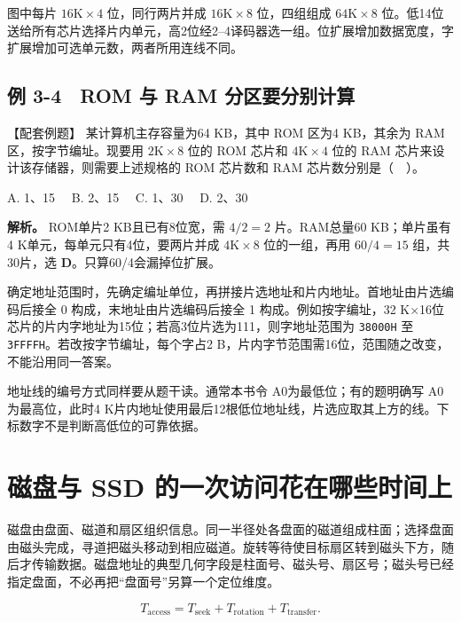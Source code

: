 图中每片 \(16\mathrm K\times4\) 位，同行两片并成 \(16\mathrm K\times8\) 位，四组组成 \(64\mathrm K\times8\) 位。低14位送给所有芯片选择片内单元，高2位经2--4译码器选一组。位扩展增加数据宽度，字扩展增加可选单元数，两者所用连线不同。

\subsection{例 3-4　ROM 与 RAM 分区要分别计算}\label{CO03-11}

\begin{example}[配套例题]

【配套例题】 某计算机主存容量为64 KB，其中 ROM 区为4 KB，其余为 RAM 区，按字节编址。现要用 \(2\mathrm K\times8\) 位的 ROM 芯片和 \(4\mathrm K\times4\) 位的 RAM 芯片来设计该存储器，则需要上述规格的 ROM 芯片数和 RAM 芯片数分别是（　）。

A. 1、15　 B. 2、15　 C. 1、30　 D. 2、30

\end{example}

\textbf{解析。} ROM单片2 KB且已有8位宽，需 \(4/2=2\) 片。RAM总量60 KB；单片虽有4 K单元，每单元只有4位，要两片并成 \(4\mathrm K\times8\) 位的一组，再用 \(60/4=15\) 组，共30片，选 \textbf{D}。只算60/4会漏掉位扩展。

确定地址范围时，先确定编址单位，再拼接片选地址和片内地址。首地址由片选编码后接全 0 构成，末地址由片选编码后接全 1 构成。例如按字编址，32 K\ensuremath{\times}16位芯片的片内字地址为15位；若高3位片选为111，则字地址范围为 \texttt{38000H} 至 \texttt{3FFFFH}。若改按字节编址，每个字占2 B，片内字节范围需16位，范围随之改变，不能沿用同一答案。

地址线的编号方式同样要从题干读。通常本书令 A0为最低位；有的题明确写 A0为最高位，此时4 K片内地址使用最后12根低位地址线，片选应取其上方的线。下标数字不是判断高低位的可靠依据。

\section{磁盘与 SSD 的一次访问花在哪些时间上}\label{CO03-12}

磁盘由盘面、磁道和扇区组织信息。同一半径处各盘面的磁道组成柱面；选择盘面由磁头完成，寻道把磁头移动到相应磁道。旋转等待使目标扇区转到磁头下方，随后才传输数据。磁盘地址的典型几何字段是柱面号、磁头号、扇区号；磁头号已经指定盘面，不必再把``盘面号''另算一个定位维度。

\[
T_{\mathrm{access}}=T_{\mathrm{seek}}+T_{\mathrm{rotation}}+T_{\mathrm{transfer}}.
\]

